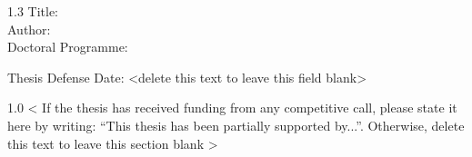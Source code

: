 
\begin{spacing}{1.3}
Title: \thesisTitle \\
Author: \thesisAuthor \\
Doctoral Programme:	 \DoctoralProgramme
\end{spacing}





Thesis Defense Date: <delete this text to leave this field blank>



\vspace{\fill}
\begin{spacing}{1.0}
< If the thesis has received funding from any competitive call, please state it here by writing: “This thesis has been partially supported by...”. Otherwise, delete this text to leave this section blank >
\end{spacing}

